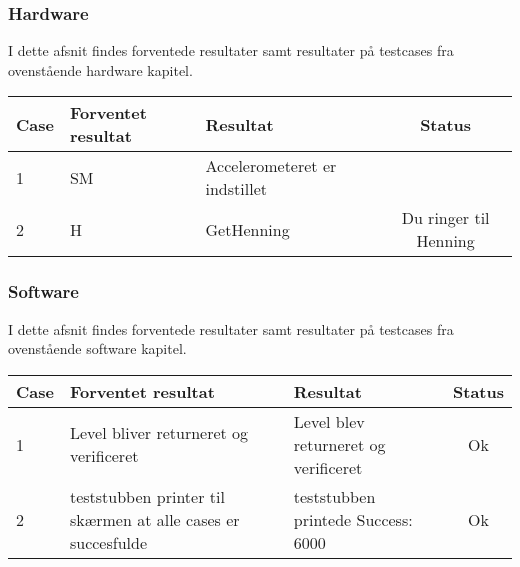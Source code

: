 \subsubsection{Hardware}
I dette afsnit findes forventede resultater samt resultater på testcases fra ovenstående hardware kapitel.\\
\begin{table}[htbp]
\centering
\begin{tabular}{| l  | p{5cm} | p{5cm} | c |}
\hline
Case &Forventet resultat &Resultat &Status\\\hline
1 &SM &Accelerometeret er indstillet & \\\hline
2 &H &GetHenning &Du ringer til Henning\\\hline
\end{tabular}
\end{table}
\subsubsection{Software}
I dette afsnit findes forventede resultater samt resultater på testcases fra ovenstående software kapitel.\\
\begin{table}[htbp]
\centering
\begin{tabular}{| l  | p{5cm} | p{5cm} | c |}
\hline
Case &Forventet resultat &Resultat &Status\\\hline
1 &Level bliver returneret og verificeret &Level blev returneret og verificeret &Ok \\\hline
2 &teststubben printer til skærmen at alle cases er succesfulde &teststubben printede Success: 6000 &Ok\\\hline
\end{tabular}
\end{table}